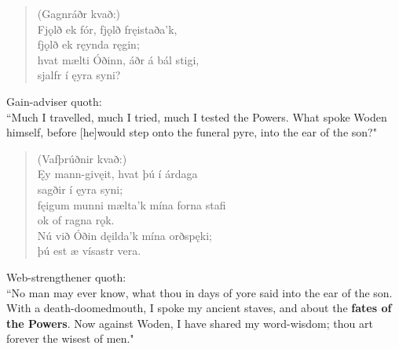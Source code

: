 \begin{verse}
(Gagnráðr kvað:) \\%
\bva Fjǫlð ek fór, \hld fjǫlð fręistaða'k, \\%
\ind fjǫlð ek ręynda ręgin; \\%
hvat mælti Óðinn, \hld áðr á bál stigi, \\%
\ind sjalfr í ęyra syni?\\%
\end{verse}

\bvb Gain-adviser quoth: \\ “Much I travelled, much I tried, much I tested the Powers. What spoke Woden himself, before [he]\footnotemark[115] would step onto the funeral pyre, into the ear of the son?" \\

\begin{verse}
(Vafþrúðnir kvað:) \\%
\bva Ęy mann-gi\footnotemark[40] vęit, \hld hvat þú í árdaga \\%
\ind sagðir í ęyra syni; \\%
fęigum munni \hld mælta'k mína forna stafi \\%
\ind ok of ragna rǫk. \\%
Nú við Óðin \hld dęilda'k mína orðspęki; \\%
\ind þú est æ vísastr vera.\\%
\end{verse}

\bvb Web-strengthener quoth: \\ “No man may ever know\footnotemark[119], what thou in days of yore said into the ear of the son. With a death-doomed\footnotemark[120] mouth, I spoke my ancient staves, and about the \textbf{fates of the Powers}\footnotemark[121]. Now against Woden, I have shared my word-wisdom\footnotemark[122]; thou art forever the wisest of men\footnotemark[123]." \\
